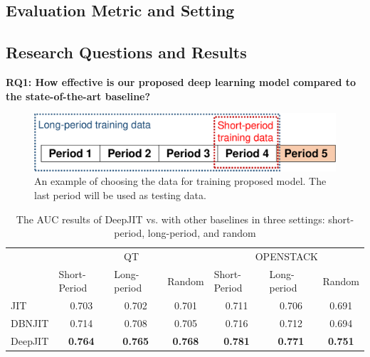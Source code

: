 \subsection{Evaluation Metric and Setting}
\label{sec:metric_setting}

\subsection{Research Questions and Results}
\label{sec:rq_results}

\noindent \textbf{RQ1: How effective is our proposed deep learning model compared to the state-of-the-art baseline?}

\begin{figure}
\center
\includegraphics[scale=0.36]{figs/split.pdf}
\caption{An example of choosing the data for training proposed model. The last period will be used as testing data.}
\label{fig:splitting}
\end{figure}

\begin{table}[t!]
  \centering
  \caption{The AUC results of DeepJIT vs. with other baselines in three settings: short-period, long-period, and random}
    \begin{tabular}{|l|c|c|c|c|c|c|}
    \hline
    \multirow{2}[4]{*}{} & \multicolumn{3}{c|}{QT} & \multicolumn{3}{c|}{OPENSTACK} \\
\cline{2-7}          & \multicolumn{1}{l|}{Short-Period} & \multicolumn{1}{l|}{Long-period} & \multicolumn{1}{l|}{Random} & \multicolumn{1}{l|}{Short-Period} & \multicolumn{1}{l|}{Long-period} & \multicolumn{1}{l|}{Random} \\
    \hline
    \hline
    JIT   & 0.703 & 0.702 & 0.701 & 0.711 & 0.706 & 0.691 \\
    \hline
    DBNJIT & 0.714 & 0.708 & 0.705 & 0.716 & 0.712 & 0.694 \\
    \hline
    DeepJIT & \textbf{0.764} & \textbf{0.765} & \textbf{0.768} & \textbf{0.781} & \textbf{0.771} & \textbf{0.751} \\
    \hline
    \end{tabular}%
  \label{tab:results}%
\end{table}%


